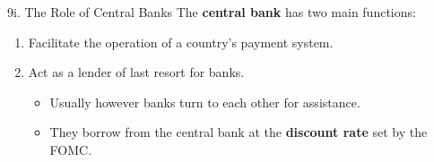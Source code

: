 \begin{CHPT_SUMM_AUTO}[label = {L.-9i}]{9i. The Role of Central Banks}
The \textbf{central bank} has two main functions: 
\begin{enumerate}[leftmargin = *]
	\item	Facilitate the operation of a country's payment system.
	\item	Act as a lender of last resort for banks.
		\begin{itemize}[leftmargin = *]
		\item	Usually however banks turn to each other for assistance.
		\item	They borrow from the central bank at the \textbf{discount rate} set by the FOMC.
		\end{itemize}
\end{enumerate}

\end{CHPT_SUMM_AUTO}